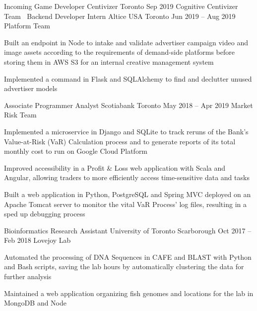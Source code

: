 \begin{cventries}
  \cventry
    {Incoming Game Developer}
    {Centivizer}
    {Toronto}
    {Sep 2019}
    {Cognitive Centivizer Team}
    {
      $\:$
    }
  \cventry
    {Backend Developer Intern}
    {Altice USA}
    {Toronto}
    {Jun 2019 -- Aug 2019}
    {Platform Team}
    {
    \begin{cvitems}
      \item {Built an endpoint in Node to intake and validate advertiser campaign video and image assets according to the requirements of demand-side platforms before storing them in AWS S3 for an internal creative management system}
      \item {Implemented a command in Flask and SQLAlchemy to find and declutter unused advertiser models}
    \end{cvitems}
    }
  \cventry
    {Associate Programmer Analyst}
    {Scotiabank}
    {Toronto}
    {May 2018 -- Apr 2019}
    {Market Risk Team}
    {
      \begin{cvitems}
        \item {Implemented a microservice in Django and SQLite to track reruns of the Bank's Value-at-Risk (VaR) Calculation process and to generate reports of its total monthly cost to run on Google Cloud Platform}
        \item {Improved accessibility in a Profit \& Loss web application with Scala and Angular, allowing traders to more efficiently access time-sensitive data and tasks}
        \item {Built a web application in Python, PostgreSQL and Spring MVC deployed on an Apache Tomcat server to monitor the vital VaR Process' log files, resulting in a sped up debugging process}
      \end{cvitems}
    }

  \cventry
    {Bioinformatics Research Assistant}
    {University of Toronto}
    {Scarborough}
    {Oct 2017 -- Feb 2018}
    {Lovejoy Lab}
    {
      \begin{cvitems}
        \item {Automated the processing of DNA Sequences in CAFE and BLAST with Python and Bash scripts, saving the lab hours by automatically clustering the data for further analysis}
        \item {Maintained a web application organizing fish genomes and locations for the lab in MongoDB and Node}
      \end{cvitems}
    }
\end{cventries}
